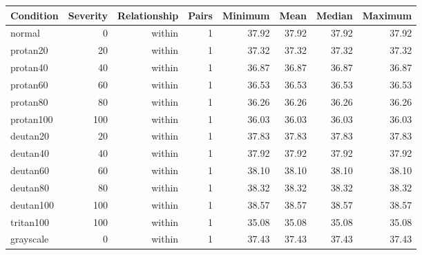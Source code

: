 \begin{tabular}{lrrrrrrr}
\toprule
Condition & Severity & Relationship & Pairs & Minimum & Mean & Median & Maximum \\
\midrule
normal & 0 & within & 1 & 37.92 & 37.92 & 37.92 & 37.92 \\
protan20 & 20 & within & 1 & 37.32 & 37.32 & 37.32 & 37.32 \\
protan40 & 40 & within & 1 & 36.87 & 36.87 & 36.87 & 36.87 \\
protan60 & 60 & within & 1 & 36.53 & 36.53 & 36.53 & 36.53 \\
protan80 & 80 & within & 1 & 36.26 & 36.26 & 36.26 & 36.26 \\
protan100 & 100 & within & 1 & 36.03 & 36.03 & 36.03 & 36.03 \\
deutan20 & 20 & within & 1 & 37.83 & 37.83 & 37.83 & 37.83 \\
deutan40 & 40 & within & 1 & 37.92 & 37.92 & 37.92 & 37.92 \\
deutan60 & 60 & within & 1 & 38.10 & 38.10 & 38.10 & 38.10 \\
deutan80 & 80 & within & 1 & 38.32 & 38.32 & 38.32 & 38.32 \\
deutan100 & 100 & within & 1 & 38.57 & 38.57 & 38.57 & 38.57 \\
tritan100 & 100 & within & 1 & 35.08 & 35.08 & 35.08 & 35.08 \\
grayscale & 0 & within & 1 & 37.43 & 37.43 & 37.43 & 37.43 \\
\bottomrule
\end{tabular}

